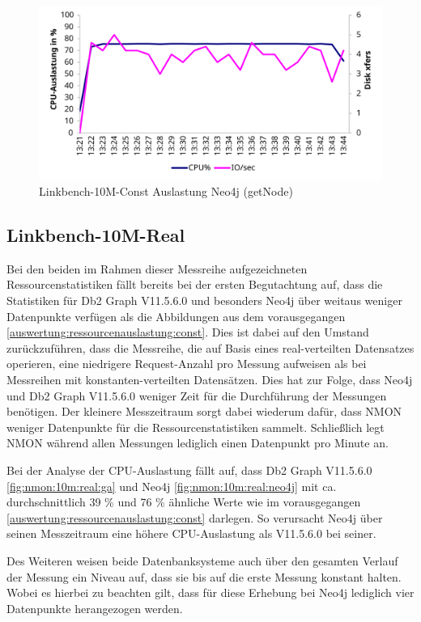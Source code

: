 \begin{figure}[!ht]
    \centering
    \includegraphics[width=\textwidth]{images/stats/linkbench-10m-const_neo4j.pdf}
    \caption{Linkbench-10M-Const Auslastung Neo4j (getNode)}
    \label{fig:nmon:10m:const:neo4j}
\end{figure}

\subsection{Linkbench-10M-Real}
\label{auswertung:ressourcenauslastung:real}
Bei den beiden im Rahmen dieser Messreihe aufgezeichneten Ressourcenstatistiken fällt bereits bei der ersten Begutachtung auf, dass die Statistiken für Db2 Graph V11.5.6.0 und besonders Neo4j über weitaus weniger Datenpunkte verfügen als die Abbildungen aus dem vorausgegangen \autoref{auswertung:ressourcenauslastung:const}. Dies ist dabei auf den Umstand zurückzuführen, dass die Messreihe, die auf Basis eines real-verteilten Datensatzes operieren, eine niedrigere Request-Anzahl pro Messung aufweisen als bei Messreihen mit konstanten-verteilten Datensätzen. Dies hat zur Folge, dass Neo4j und Db2 Graph V11.5.6.0 weniger Zeit für die Durchführung der Messungen benötigen. Der kleinere Messzeitraum sorgt dabei wiederum dafür, dass NMON weniger Datenpunkte für die Ressourcenstatistiken sammelt. Schließlich legt NMON während allen Messungen lediglich einen Datenpunkt pro Minute an. 

Bei der Analyse der CPU-Auslastung fällt auf, dass Db2 Graph V11.5.6.0 \autoref{fig:nmon:10m:real:ga} und Neo4j \autoref{fig:nmon:10m:real:neo4j} mit ca. durchschnittlich 39 \% und 76 \% ähnliche Werte wie im vorausgegangen \autoref{auswertung:ressourcenauslastung:const} darlegen. So verursacht Neo4j über seinen Messzeitraum eine höhere CPU-Auslastung als V11.5.6.0 bei seiner.   

Des Weiteren weisen beide Datenbanksysteme auch über den gesamten Verlauf der Messung ein Niveau auf, dass sie bis auf die erste Messung konstant halten. Wobei es hierbei zu beachten gilt, dass für diese Erhebung bei Neo4j lediglich vier Datenpunkte herangezogen werden.

